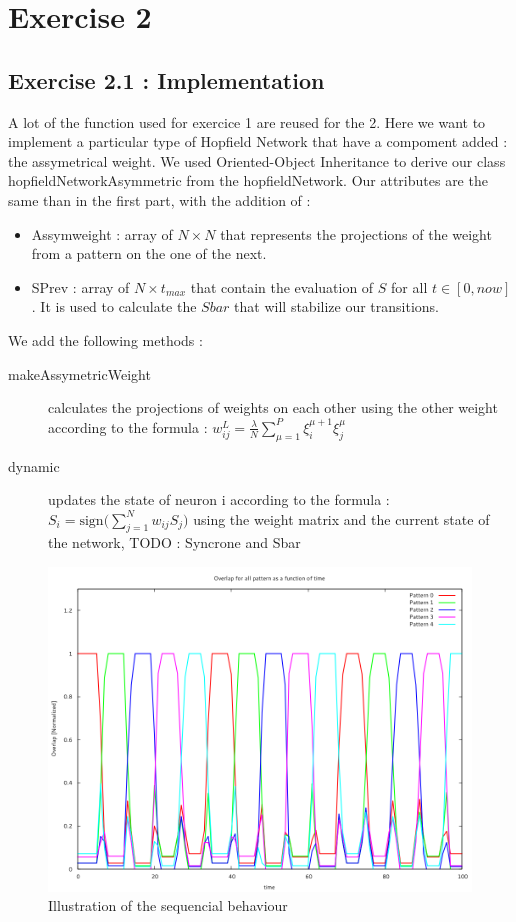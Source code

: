 \section{Exercise 2}

\subsection{Exercise 2.1 : Implementation}
A lot of the function used for exercice 1 are reused for the 2. Here we want to 
implement a particular type of Hopfield Network that have a compoment added : the assymetrical 
weight. We used Oriented-Object Inheritance to derive our class hopfieldNetworkAsymmetric
from the hopfieldNetwork. Our attributes are the same than in the first part, with the addition
of :
\begin{itemize}
\item Assymweight : array of $N\times N$ that represents the projections of the weight from a 
pattern on the one of the next.
\item SPrev : array of $N \times t_{max}$ that contain the evaluation of $S$ for all $t \in
 [0, now]$. It is used to calculate the $Sbar$ that will stabilize our transitions.
\end{itemize}

We add the following methods :
\begin{description}
\item [makeAssymetricWeight] calculates the projections of weights 
on each other using the other weight according to the formula : 
$w_{ij}^L = \frac{\lambda}{N}\sum_{\mu=1}^P \xi_i^{\mu+1} \xi_j^{\mu}$
\item[dynamic] updates the state of neuron i according to the formula : $S_i = \textrm{sign}\big(\sum_{j=1}^N w_{ij}S_j\big)$ using the weight matrix and the current state of the network,
TODO : Syncrone and Sbar
\end{description}

\begin{center}
    \begin{figure}\label{transtime}
    \caption{Illustration of the sequencial behaviour}
    \includegraphics[scale=0.5]{img/ex21.png}
    \end{figure}
\end{center}



